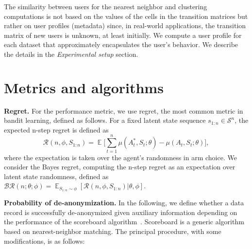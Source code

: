 \documentclass{article}
\DeclareMathOperator{\EX}{\mathbb{E}}
\begin{document}
The similarity between users for the nearest neighbor and clustering computations is not based on the values of the cells in the transition matrices but rather on user profiles (metadata) since, in real-world applications, the transition matrix of new users is unknown, at least initially. We compute a user profile for each dataset that approximately encapsulates the user's behavior. We describe the details in the \textit{Experimental setup} section.


\section{Metrics and algorithms}

\textbf{Regret.} For the performance metric, we use regret, the most common metric in bandit learning, defined as follows. For a fixed latent state sequence $s_{1:n} \in \mathcal{S}^n$, the expected n-step regret is defined as
\begin{equation}
    \mathcal{R}(n, \phi, S_{1:n}) = \EX\Bigg[\sum_{t=1}^n\mu(A_t^*, S_t;\theta) - \mu(A_t, S_t;\theta)\Bigg],
\end{equation}
where the expectation is taken over the agent's randomness in arm choice. We consider the Bayes regret, computing the n-step regret as an expectation over latent state randomness, defined as $\mathcal{BR}(n;\theta;\phi) = \EX_{S_{1:n} \sim \phi} [\mathcal{R}(n, \phi, S_{1:n}) | \theta, \phi]$.

\textbf{Probability of de-anonymization.} In the following, we define whether a data record is successfully de-anonymized given auxiliary information depending on the performance of the scoreboard algorithm~\cite{Narayanan2008}. Scoreboard is a generic algorithm based on nearest-neighbor matching. The principal procedure, with some modifications, is as follows:
\end{document}
